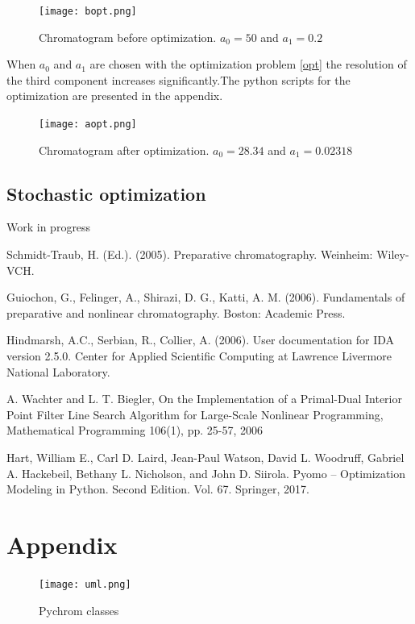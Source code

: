 \documentclass[paper=a4, fontsize=11pt]{scrartcl}
\begin{document}
\begin{figure}[!h]
\label{bopt}
\centering
\texttt{[image: bopt.png]}
\caption{Chromatogram before optimization. $a_0=50$ and $a_1=0.2$}
\end{figure}

When $a_0$ and $a_1$ are chosen with the optimization problem \eqref{opt} the resolution of the third component increases significantly.The python scripts for the optimization are presented in the appendix.

\begin{figure}[!h]
\label{bopt}
\centering
\texttt{[image: aopt.png]}
\caption{Chromatogram after optimization. $a_0=28.34$ and $a_1=0.02318$}
\end{figure}

\subsection{Stochastic optimization}
Work in progress


\begin{thebibliography}{9} 
Schmidt-Traub, H. (Ed.). (2005). Preparative chromatography. Weinheim: Wiley-VCH.
 
Guiochon, G., Felinger, A., Shirazi, D. G., Katti, A. M. (2006). Fundamentals of preparative and nonlinear chromatography. Boston: Academic Press.

Hindmarsh, A.C., Serbian, R., Collier, A. (2006). User documentation for IDA version
2.5.0. Center for Applied Scientific Computing at Lawrence Livermore National Laboratory.

A. Wachter and L. T. Biegler, ​On the Implementation of a Primal-Dual Interior Point Filter Line Search Algorithm for Large-Scale Nonlinear Programming, Mathematical Programming 106(1), pp. 25-57, 2006

Hart, William E., Carl D. Laird, Jean-Paul Watson, David L. Woodruff, Gabriel A. Hackebeil, Bethany L. Nicholson, and John D. Siirola. Pyomo – Optimization Modeling in Python. Second Edition.  Vol. 67. Springer, 2017.

\end{thebibliography}
\newpage
\section{Appendix}

\begin{figure}
\centering
\texttt{[image: uml.png]}
\caption{Pychrom classes}
\end{figure}




\end{document}
